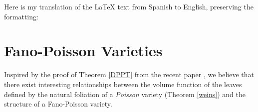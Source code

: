 \documentclass{article}
\begin{document}
%

Here is my translation of the LaTeX text from Spanish to English, preserving the formatting:

\section{Fano-Poisson Varieties}
\noindent Inspired by the proof of Theorem \ref{DPPT} from the recent paper \cite{DPPT}, we believe that there exist
interesting relationships between the volume function of the leaves defined by the natural foliation of a \emph{Poisson} variety
(Theorem \ref{weins}) and the structure of a Fano-Poisson variety.
\end{document}
